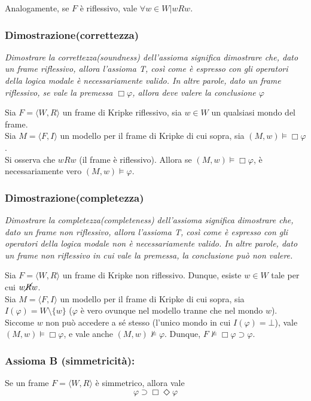 Analogamente, se $F$ è riflessivo, vale $\forall w \in W | wRw$.

\subsubsection{Dimostrazione(correttezza)}
\textit{Dimostrare la correttezza(soundness) dell'assioma significa dimostrare che, dato un frame riflessivo, allora l'assioma T, così come è espresso con gli operatori della logica modale è necessariamente valido. In altre parole, dato un frame riflessivo, se vale la premessa $\Box \varphi$, allora deve valere la conclusione $\varphi$}

Sia $F = \langle W, R \rangle$ un frame di Kripke riflessivo, sia $w \in W$ un qualsiasi mondo del frame.\\
Sia $M = \langle F, I \rangle$ un modello per il frame di Kripke di cui sopra, sia $(M, w) \models \Box \varphi$.\\
Si osserva che $wRw$ (il frame è riflessivo). Allora se $(M, w) \models \Box \varphi$, è necessariamente vero $(M, w) \models \varphi$.

\subsubsection{Dimostrazione(completezza)}
\textit{Dimostrare la completezza(completeness) dell'assioma significa dimostrare che, dato un frame non riflessivo, allora l'assioma T, così come è espresso con gli operatori della logica modale non è necessariamente valido. In altre parole, dato un frame non riflessivo in cui vale la premessa, la conclusione può non valere.}

Sia $F = \langle W, R \rangle$ un frame di Kripke non riflessivo. Dunque, esiste $w \in W$ tale per cui $w\cancel{R}w$.\\
Sia $M = \langle F, I \rangle$ un modello per il frame di Kripke di cui sopra, sia $I(\varphi) = W \setminus \{w\}$ ($\varphi$ è vero ovunque nel modello tranne che nel mondo $w$).\\
Siccome $w$ non può accedere a sé stesso (l'unico mondo in cui $I(\varphi) = \bot$), vale $(M, w) \models \Box \varphi$, e vale anche $(M, w) \not \models \varphi$. Dunque, $F \not \models \Box \varphi \supset \varphi$.
\\

\subsubsection{Assioma B (simmetricità):} Se un frame $F = \langle W, R \rangle$ è simmetrico, allora vale $$\varphi \supset \Box \Diamond \varphi$$

